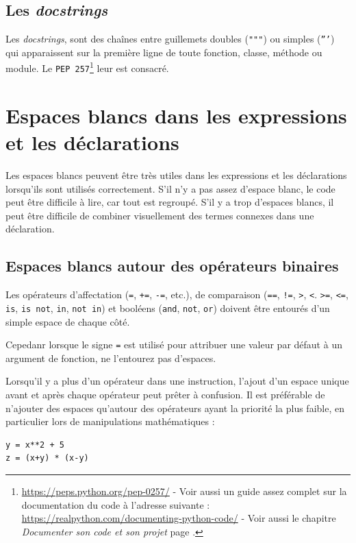 \documentclass[a4paper,11pt]{book}
\begin{document}
\subsection*{Les \textit{docstrings}}
Les \textit{docstrings}, sont des chaînes entre guillemets doubles (\texttt{"""}) ou simples (\texttt{'''}) qui apparaissent sur la première ligne de toute fonction, classe, méthode ou module. Le \texttt{PEP 257}\footnote{\url{https://peps.python.org/pep-0257/} - Voir aussi un guide assez complet sur la documentation du code à l'adresse suivante : \url{https://realpython.com/documenting-python-code/} - Voir aussi le chapitre \textit{Documenter son code et son projet} page \pageref{documentercodeprojet}.} leur est consacré.
\medskip

\section{Espaces blancs dans les expressions et les déclarations}
Les espaces blancs peuvent être très utiles dans les expressions et les déclarations lorsqu'ils sont utilisés correctement. S'il n'y a pas assez d'espace blanc, le code peut être difficile à lire, car tout est regroupé. S'il y a trop d'espaces blancs, il peut être difficile de combiner visuellement des termes connexes dans une déclaration.
\medskip

\subsection*{Espaces blancs autour des opérateurs binaires
}
Les opérateurs d'affectation (\texttt{=}, \texttt{+=}, \texttt{-=}, etc.), de comparaison (\texttt{==}, \texttt{!=}, \texttt{>}, \texttt{<}. \texttt{>=}, \texttt{<=}, \texttt{is}, \texttt{is not}, \texttt{in}, \texttt{not in}) et booléens (\texttt{and}, \texttt{not}, \texttt{or}) doivent être entourés d'un simple espace de chaque côté.
\medskip

Cepedanr lorsque le signe \texttt{=} est utilisé pour attribuer une valeur par défaut à un argument de fonction, ne l'entourez pas d'espaces.
\medskip

Lorsqu'il y a plus d'un opérateur dans une instruction, l'ajout d'un espace unique avant et après chaque opérateur peut prêter à confusion. Il est préférable de n'ajouter des espaces qu'autour des opérateurs ayant la priorité la plus faible, en particulier lors de manipulations mathématiques : 
\begin{lstlisting}
y = x**2 + 5
z = (x+y) * (x-y)
\end{lstlisting}
\medskip
\end{document}
